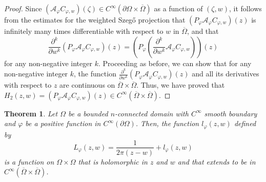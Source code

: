\documentclass[11pt, reqno]{amsart}
\newtheorem{thm}{Theorem}[section]
\numberwithin{equation}{section}
\begin{document}
\begin{proof}
Since $(\mathcal{A}_{\varphi}C_{\varphi,w})(\zeta)\in C^{\infty}(\partial\Omega\times\overline{\Omega})$ as a function of $(\zeta,w)$, it follows from the estimates for the weighted Szeg\H{o} projection that $(P_{\varphi}\mathcal{A}_{\varphi}C_{\varphi,w})(z)$ is infinitely many times differentiable with respect to $w$ in $\overline{\Omega}$, and that
\[
\frac{\partial^k}{\partial w^k}(P_{\varphi}\mathcal{A}_{\varphi}C_{\varphi,w})(z)=\left(P_{\varphi}\left(\frac{\partial^k}{\partial w^k}\mathcal{A}_{\varphi}C_{\varphi,w}\right)\right)(z)
\]
for any non-negative integer $k$. Proceeding as before, we can show that for any non-negative integer $k$, the function $\frac{\partial^k}{\partial w^k}(P_{\varphi}\mathcal{A}_{\varphi}C_{\varphi,w})(z)$ and all its derivatives with respect to $z$ are continuous on $\overline{\Omega}\times\overline{\Omega}$.
Thus, we have proved that $H_2(z,w)=(P_{\varphi}\mathcal{A}_{\varphi}C_{\varphi,w})(z)\in C^{\infty}(\overline{\Omega}\times\overline{\Omega})$.
\end{proof}

\begin{thm}
Let $\Omega$ be a bounded $n$-connected domain with $C^{\infty}$ smooth boundary and $\varphi$ be a positive function in $C^{\infty}(\partial\Omega)$. Then, the function $l_{\varphi}(z,w)$ defined by 
\[
L_{\varphi}(z,w) = \frac{1}{2\pi(z-w)} + l_{\varphi}(z,w)
\]
is a function on $\Omega\times\Omega$ that is holomorphic in $z$ and $w$ and that extends to be in $C^{\infty}(\overline{\Omega}\times\overline{\Omega})$.
\end{thm}
\end{document}

